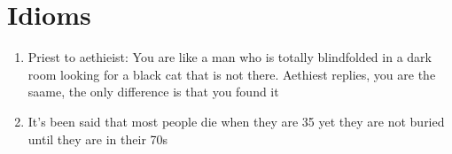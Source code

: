 
\chapter*{Idioms}

    \begin{enumerate}
        \item Priest to aethieist: You are like a man who is totally blindfolded in a dark room looking for a black cat that is not there. Aethiest replies, you are the saame, the only difference is that you found it
        \item It’s
        been said that most people die when they are 35 yet they are not buried until they are in their 70s
    \end{enumerate}

